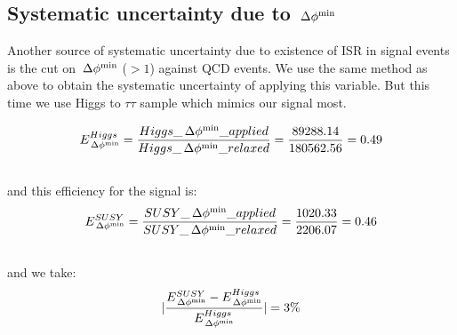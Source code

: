 





\subsection{\texorpdfstring{Systematic uncertainty due to $\,{\Delta\phi^{\rm min}}$}{Systematic uncertainty due to minDeltaPhi40}}
Another source of systematic uncertainty due to existence of ISR in signal events is the cut on $\,{\Delta\phi^{\rm min}}$ ($ > 1$) against QCD events. We use the same method as above to obtain the systematic uncertainty of applying this variable. But this time we use Higgs to $\tau \tau$ sample which mimics our signal most.

\begin{align}
E^{Higgs}_{\,{\Delta\phi^{\rm min}}} &= \frac{Higgs\_\,{\Delta\phi^{\rm min}}\_applied}{Higgs\_\,{\Delta\phi^{\rm min}}\_relaxed} = \frac{89288.14}{180562.56} = 0.49 \\ \nonumber
\end{align}
and this efficiency for the signal is: 
\begin{align}
E^{SUSY}_{\,{\Delta\phi^{\rm min}}} &= \frac{SUSY\_\,{\Delta\phi^{\rm min}}\_applied}{SUSY\_\,{\Delta\phi^{\rm min}}\_relaxed} = \frac{1020.33}{2206.07} = 0.46 \\ \nonumber
\end{align}
and we take:
\begin{align}
|\frac{E^{SUSY}_{\,{\Delta\phi^{\rm min}}}-E^{Higgs}_{\,{\Delta\phi^{\rm min}}}}{E^{Higgs}_{\,{\Delta\phi^{\rm min}}}}| &= 3 \% \\ \nonumber
\end{align}

